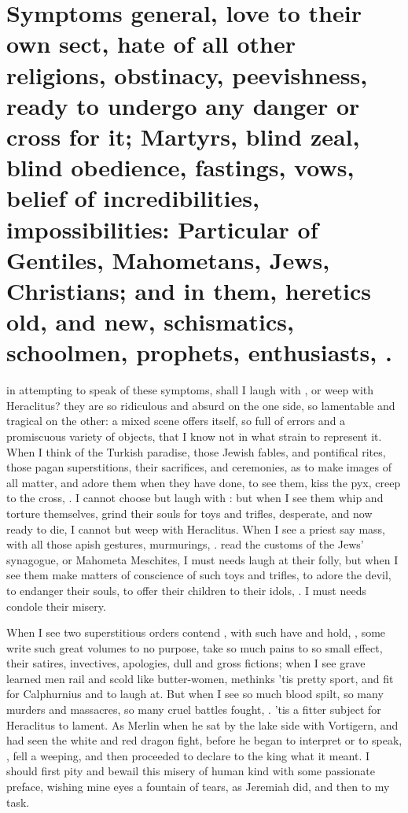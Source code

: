 {%
\section[Symptoms general]{Symptoms general, love to their own sect, hate of all other religions, obstinacy, peevishness, ready to undergo any danger or cross for it; Martyrs, blind zeal, blind obedience, fastings, vows, belief of incredibilities, impossibilities: Particular of Gentiles, Mahometans, Jews, Christians; and in them, heretics old, and new, schismatics, schoolmen, prophets, enthusiasts, \etc{}.}

 in attempting to speak of these
symptoms, shall I laugh with \Democritus{}, or weep with Heraclitus? they
are so ridiculous and absurd on the one side, so lamentable and
tragical on the other: a mixed scene offers itself, so full of errors
and a promiscuous variety of objects, that I know not in what strain to
represent it. When I think of the Turkish paradise, those Jewish
fables, and pontifical rites, those pagan superstitions, their
sacrifices, and ceremonies, as to make images of all matter, and adore
them when they have done, to see them, kiss the pyx, creep to the
cross, \etc{}. I cannot choose but laugh with \Democritus{}: but when I see
them whip and torture themselves, grind their souls for toys and
trifles, desperate, and now ready to die, I cannot but weep with
Heraclitus. When I see a priest say mass, with all those apish
gestures, murmurings, \etc{}. read the customs of the Jews' synagogue, or
Mahometa Meschites, I must needs laugh at their folly,  but when I see them make matters of conscience of such
toys and trifles, to adore the devil, to endanger their souls, to offer
their children to their idols, \etc{}. I must needs condole their misery.

When I see two superstitious orders contend , with
such have and hold, , some write such great volumes to
no purpose, take so much pains to so small effect, their satires,
invectives, apologies, dull and gross fictions; when I see grave
learned men rail and scold like butter-women, methinks 'tis pretty
sport, and fit for Calphurnius and \Democritus{} to laugh at. But
when I see so much blood spilt, so many murders and massacres, so many
cruel battles fought, \etc{}. 'tis a fitter subject for Heraclitus to
lament. As Merlin when he sat by the lake side with Vortigern,
and had seen the white and red dragon fight, before he began to
interpret or to speak, , fell a weeping, and then
proceeded to declare to the king what it meant. I should first pity and
bewail this misery of human kind with some passionate preface, wishing
mine eyes a fountain of tears, as Jeremiah did, and then to my task.

}
